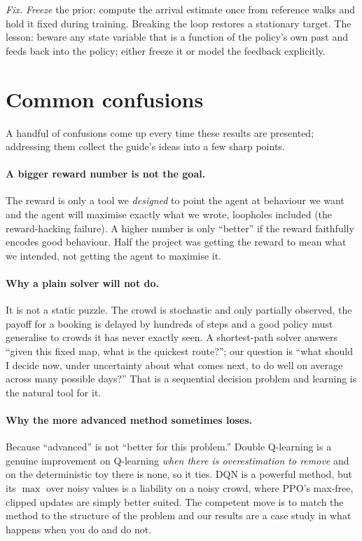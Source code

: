 \documentclass[11pt]{article}
\newcommand{\key}[1]{\textit{#1}}            %
\begin{document}
\emph{Fix.} \key{Freeze} the prior: compute the arrival estimate once from reference walks and
hold it fixed during training. Breaking the loop restores a stationary target. The lesson:
beware any state variable that is a function of the policy's own past and feeds back into the
policy; either freeze it or model the feedback explicitly.

\section{Common confusions}

A handful of confusions come up every time these results are presented; addressing them
collect the guide's ideas into a few sharp points.

\paragraph{A bigger reward number is not the goal.} The reward is only a tool we
\emph{designed} to point the agent at behaviour we want and the agent will maximise exactly
what we wrote, loopholes included (the reward-hacking failure). A higher number is only
``better'' if the reward faithfully encodes good behaviour. Half the project was getting the
reward to mean what we intended, not getting the agent to maximise it.

\paragraph{Why a plain solver will not do.} It is not a static
puzzle. The crowd is stochastic and only partially observed, the payoff for a booking is
delayed by hundreds of steps and a good policy must generalise to crowds it has never
exactly seen. A shortest-path solver answers ``given this fixed map, what is the quickest
route?''; our question is ``what should I decide now, under uncertainty about what comes
next, to do well on average across many possible days?'' That is a sequential decision
problem and learning is the natural tool for it.

\paragraph{Why the more advanced method sometimes loses.} Because ``advanced'' is not
``better for this problem.'' Double Q-learning is a genuine improvement on Q-learning
\emph{when there is overestimation to remove} and on the deterministic toy there is none,
so it ties. DQN is a powerful method, but its $\max$ over noisy values is a liability on a
noisy crowd, where PPO's max-free, clipped updates are simply better suited. The competent
move is to match the method to the structure of the problem and our results are a
case study in what happens when you do and do not.
\end{document}
